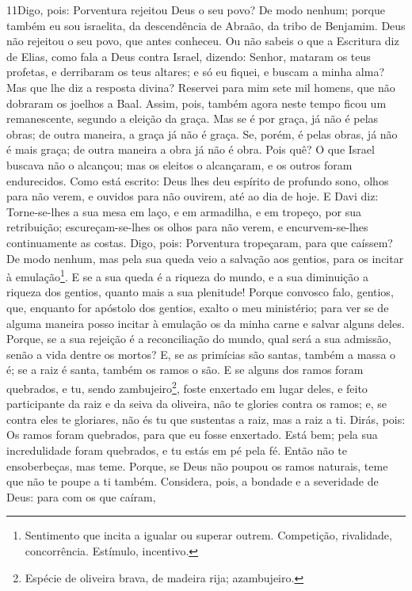 \lettrine{11} Digo, pois: Porventura rejeitou Deus o seu povo?
De modo nenhum; porque também eu sou israelita, da descendência de
Abraão, da tribo de Benjamim. Deus não rejeitou o seu povo, que
antes conheceu. Ou não sabeis o que a Escritura diz de Elias, como
fala a Deus contra Israel, dizendo: Senhor, mataram os teus
profetas, e derribaram os teus altares; e só eu fiquei, e buscam a
minha alma? Mas que lhe diz a resposta divina? Reservei para mim
sete mil homens, que não dobraram os joelhos a Baal. Assim,
pois, também agora neste tempo ficou um remanescente, segundo a
eleição da graça. Mas se é por graça, já não é pelas obras; de
outra maneira, a graça já não é graça. Se, porém, é pelas obras, já
não é mais graça; de outra maneira a obra já não é obra. Pois
quê? O que Israel buscava não o alcançou; mas os eleitos o
alcançaram, e os outros foram endurecidos. Como está escrito:
Deus lhes deu espírito de profundo sono, olhos para não verem, e
ouvidos para não ouvirem, até ao dia de hoje. E Davi diz:
Torne-se-lhes a sua mesa em laço, e em armadilha, e em tropeço, por
sua retribuição; escureçam-se-lhes os olhos para não verem, e
encurvem-se-lhes continuamente as costas. Digo, pois:
Porventura tropeçaram, para que caíssem? De modo nenhum, mas pela
sua queda veio a salvação aos gentios, para os incitar à
emulação\footnote{Sentimento que incita a igualar ou superar outrem.
Competição, rivalidade, concorrência. Estímulo, incentivo.}.
E se a sua queda é a riqueza do mundo, e a sua diminuição a
riqueza dos gentios, quanto mais a sua plenitude! Porque
convosco falo, gentios, que, enquanto for apóstolo dos gentios,
exalto o meu ministério; para ver se de alguma maneira posso
incitar à emulação os da minha carne e salvar alguns deles.
Porque, se a sua rejeição é a reconciliação do mundo, qual
será a sua admissão, senão a vida dentre os mortos? E, se as
primícias são santas, também a massa o é; se a raiz é santa, também
os ramos o são. E se alguns dos ramos foram quebrados, e tu,
sendo zambujeiro\footnote{Espécie de oliveira brava, de madeira
rija; azambujeiro.}, foste enxertado em lugar deles, e feito
participante da raiz e da seiva da oliveira, não te glories
contra os ramos; e, se contra eles te gloriares, não és tu que
sustentas a raiz, mas a raiz a ti. Dirás, pois: Os ramos
foram quebrados, para que eu fosse enxertado. Está bem; pela
sua incredulidade foram quebrados, e tu estás em pé pela fé. Então
não te ensoberbeças, mas teme. Porque, se Deus não poupou os
ramos naturais, teme que não te poupe a ti também. Considera,
pois, a bondade e a severidade de Deus: para com os que caíram,
